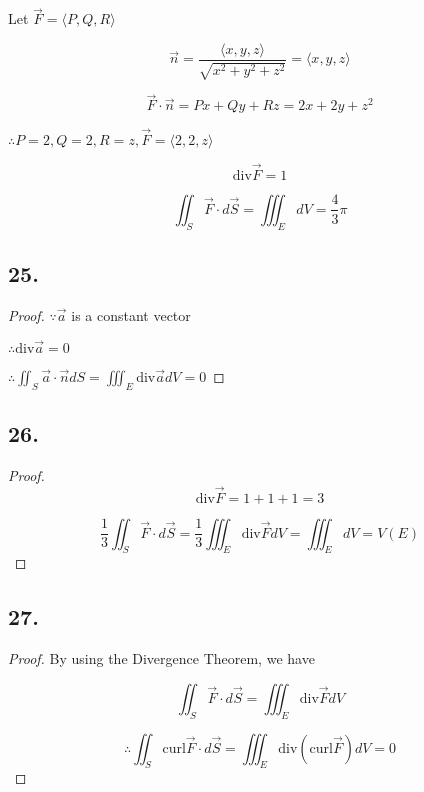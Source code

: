 \documentclass{article}
\begin{document}
  Let $\overrightarrow F = \langle P, Q, R \rangle$

  $$\overrightarrow n = \frac{\langle x, y, z \rangle}{\sqrt{x^2 + y^2 + z^2}} = \langle x, y, z \rangle$$

  $$\overrightarrow F \cdot \overrightarrow n = Px + Qy + Rz = 2x + 2y + z^2$$

  $\therefore P = 2, Q = 2, R = z, \overrightarrow F = \langle 2, 2, z \rangle$

  $$\textrm{div} \overrightarrow F = 1$$

  $$\iint_S \overrightarrow F \cdot d \overrightarrow S = \iiint_E dV = \frac{4}{3}\pi$$

  \subsection*{25.}

  \begin{proof}
    $\because \overrightarrow a$ is a constant vector

    $\therefore \textrm{div} \overrightarrow a = 0$

    $\therefore \iint_S \overrightarrow a \cdot \overrightarrow n dS = \iiint_E \textrm{div} \overrightarrow a dV = 0$
  \end{proof}

  \subsection*{26.}

  \begin{proof}
    $$\textrm{div} \overrightarrow F = 1 + 1 + 1 = 3$$

    $$\frac{1}{3} \iint_S \overrightarrow F \cdot d \overrightarrow S = \frac{1}{3} \iiint_E \textrm{div} \overrightarrow F dV = \iiint_E dV = V(E)$$
  \end{proof}

  \subsection*{27.}


  \begin{proof}
    
  By using the Divergence Theorem, we have

  $$\iint_S \overrightarrow{F} \cdot d \overrightarrow{S} = \iiint_E \textrm{div} \overrightarrow{F} dV$$

  $$\therefore \iint_S \textrm{curl} \overrightarrow{F} \cdot d \overrightarrow{S} = \iiint_E \textrm{div} (\textrm{curl} \overrightarrow{F}) dV = 0$$

  \end{proof}
\end{document}
